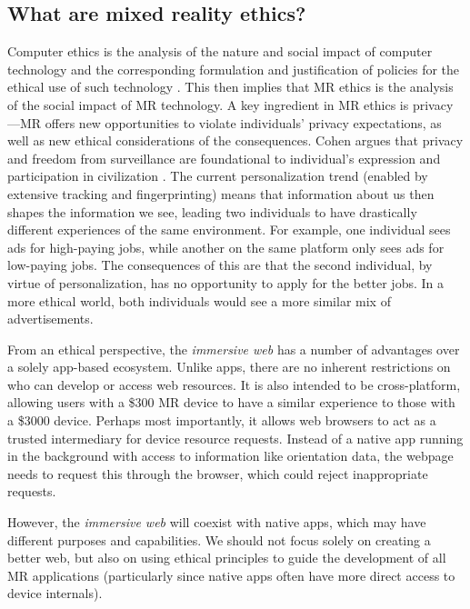 \subsection{What are mixed reality ethics?}\label{sec:ethics}

Computer ethics is the analysis of the nature and social impact of computer technology and the corresponding formulation and justification of policies for the ethical use of such technology \cite{moor1985computer}. This then implies that MR ethics is the analysis of the social impact of MR technology. A key ingredient in MR ethics is privacy---MR offers new opportunities to violate individuals' privacy expectations, as well as new ethical considerations of the consequences. Cohen argues that privacy and freedom from surveillance are foundational to individual's expression and participation in civilization \cite{cohen2012privacy}. The current personalization trend (enabled by extensive tracking and fingerprinting) means that information about us then shapes the information we see, leading two individuals to have drastically different experiences of the same environment. For example, one individual sees ads for high-paying jobs, while another on the same platform only sees ads for low-paying jobs. The consequences of this are that the second individual, by virtue of personalization, has no opportunity to apply for the better jobs. In a more ethical world, both individuals would see a more similar mix of advertisements.

From an ethical perspective, the \emph{immersive web} has a number of advantages over a solely app-based ecosystem. Unlike apps, there are no inherent restrictions on who can develop or access web resources. It is also intended to be cross-platform, allowing users with a \$300 MR device to have a similar experience to those with a \$3000 device. Perhaps most importantly, it allows web browsers to act as a trusted intermediary for device resource requests. Instead of a native app running in the background with access to information like orientation data, the webpage needs to request this through the browser, which could reject inappropriate requests.

However, the \emph{immersive web} will coexist with native apps, which may have different purposes and capabilities. We should not focus solely on creating a better web, but also on using ethical principles to guide the development of all MR applications (particularly since native apps often have more direct access to device internals).

